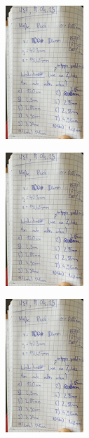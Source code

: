 \begin{minipage}[t]{0.4\textwidth}
    \includegraphics[height=5cm, page=3]{Abbildungen/Buch 14.04.2023.pdf}
\end{minipage}
\begin{minipage}[t]{0.4\textwidth}
    \includegraphics[height=5cm, page=4]{Abbildungen/Buch 14.04.2023.pdf}
\end{minipage}

\begin{minipage}[t]{0.4\textwidth}
    \includegraphics[height=5cm, page=5]{Abbildungen/Buch 14.04.2023.pdf}
\end{minipage}


